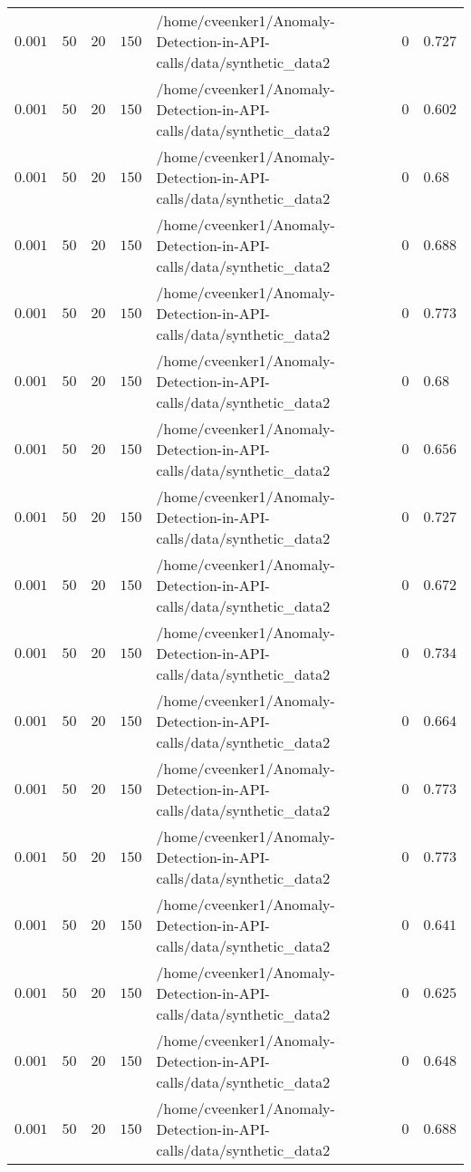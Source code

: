 \begin{table}[tbp]
\begin{tabular}{lllllll}
$0.001$ & $50$ & $20$ & $150$ & /home/cveenker1/Anomaly-Detection-in-API-calls/data/synthetic\_data2 & $0$ & $0.727$ \\
$0.001$ & $50$ & $20$ & $150$ & /home/cveenker1/Anomaly-Detection-in-API-calls/data/synthetic\_data2 & $0$ & $0.602$ \\
$0.001$ & $50$ & $20$ & $150$ & /home/cveenker1/Anomaly-Detection-in-API-calls/data/synthetic\_data2 & $0$ & $0.68$ \\
$0.001$ & $50$ & $20$ & $150$ & /home/cveenker1/Anomaly-Detection-in-API-calls/data/synthetic\_data2 & $0$ & $0.688$ \\
$0.001$ & $50$ & $20$ & $150$ & /home/cveenker1/Anomaly-Detection-in-API-calls/data/synthetic\_data2 & $0$ & $0.773$ \\
$0.001$ & $50$ & $20$ & $150$ & /home/cveenker1/Anomaly-Detection-in-API-calls/data/synthetic\_data2 & $0$ & $0.68$ \\
$0.001$ & $50$ & $20$ & $150$ & /home/cveenker1/Anomaly-Detection-in-API-calls/data/synthetic\_data2 & $0$ & $0.656$ \\
$0.001$ & $50$ & $20$ & $150$ & /home/cveenker1/Anomaly-Detection-in-API-calls/data/synthetic\_data2 & $0$ & $0.727$ \\
$0.001$ & $50$ & $20$ & $150$ & /home/cveenker1/Anomaly-Detection-in-API-calls/data/synthetic\_data2 & $0$ & $0.672$ \\
$0.001$ & $50$ & $20$ & $150$ & /home/cveenker1/Anomaly-Detection-in-API-calls/data/synthetic\_data2 & $0$ & $0.734$ \\
$0.001$ & $50$ & $20$ & $150$ & /home/cveenker1/Anomaly-Detection-in-API-calls/data/synthetic\_data2 & $0$ & $0.664$ \\
$0.001$ & $50$ & $20$ & $150$ & /home/cveenker1/Anomaly-Detection-in-API-calls/data/synthetic\_data2 & $0$ & $0.773$ \\
$0.001$ & $50$ & $20$ & $150$ & /home/cveenker1/Anomaly-Detection-in-API-calls/data/synthetic\_data2 & $0$ & $0.773$ \\
$0.001$ & $50$ & $20$ & $150$ & /home/cveenker1/Anomaly-Detection-in-API-calls/data/synthetic\_data2 & $0$ & $0.641$ \\
$0.001$ & $50$ & $20$ & $150$ & /home/cveenker1/Anomaly-Detection-in-API-calls/data/synthetic\_data2 & $0$ & $0.625$ \\
$0.001$ & $50$ & $20$ & $150$ & /home/cveenker1/Anomaly-Detection-in-API-calls/data/synthetic\_data2 & $0$ & $0.648$ \\
$0.001$ & $50$ & $20$ & $150$ & /home/cveenker1/Anomaly-Detection-in-API-calls/data/synthetic\_data2 & $0$ & $0.688$ \\

\end{tabular}
\end{table}
